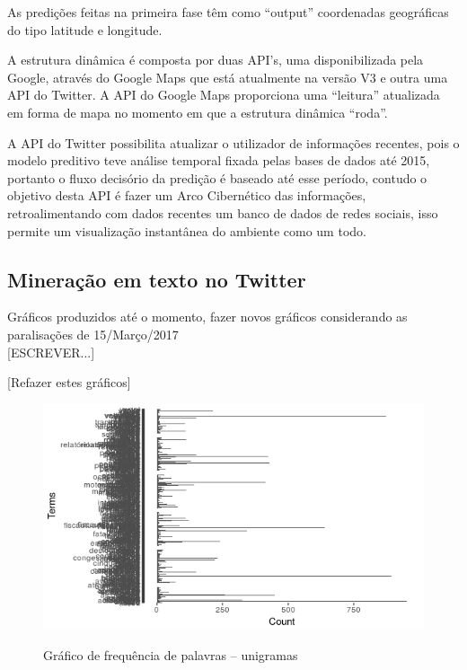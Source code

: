 As predições feitas na primeira fase têm como ``output'' coordenadas geográficas do tipo latitude e longitude.

A estrutura dinâmica é composta por duas API's, uma disponibilizada pela Google, através do Google Maps que está atualmente na versão V3 e 
outra uma API do Twitter. A API do Google Maps proporciona uma ``leitura'' atualizada em forma de mapa no momento em que a estrutura dinâmica ``roda''.

A API do Twitter possibilita atualizar o utilizador de informações recentes, pois o modelo preditivo teve análise temporal fixada 
pelas bases de dados até 2015, portanto o fluxo decisório da predição é baseado até esse período, contudo o objetivo desta API é fazer 
um Arco Cibernético das informações, retroalimentando com dados recentes um banco de dados de redes sociais, isso permite um visualização 
instantânea do ambiente como um todo.


\subsection{Mineração em texto no Twitter}

Gráficos produzidos até o momento, fazer novos gráficos considerando as paralisações de 15/Março/2017
\\

[ESCREVER...]

\pagebreak

[Refazer estes gráficos]
\begin{figure}
\centering
\caption{Gráfico de frequência de palavras -- unigramas}
\includegraphics[width=0.9\linewidth]{Figuras/Twitter/freqPalavras}
\label{fig:freqPalavras}
\end{figure}

\quad

